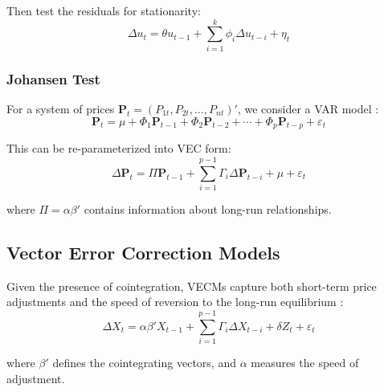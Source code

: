Then test the residuals for stationarity:
\vspace{-0.5em}
\begin{equation}
\Delta u_t = \theta u_{t-1} + \sum_{i=1}^{k} \phi_i \Delta u_{t-i} + \eta_t
\end{equation}
\vspace{-0.5em}

\subsubsection{Johansen Test}
For a system of prices $\mathbf{P}_t = (P_{1t}, P_{2t}, \ldots, P_{nt})'$, we consider a VAR model \citep{johansen1995}:
\vspace{-0.5em}
\begin{equation}
\mathbf{P}_t = \mu + \Phi_1 \mathbf{P}_{t-1} + \Phi_2 \mathbf{P}_{t-2} + \cdots + \Phi_p \mathbf{P}_{t-p} + \varepsilon_t
\end{equation}
\vspace{-0.5em}

This can be re-parameterized into VEC form:
\vspace{-0.5em}
\begin{equation}
\Delta \mathbf{P}_t = \Pi \mathbf{P}_{t-1} + \sum_{i=1}^{p-1} \Gamma_i \Delta \mathbf{P}_{t-i} + \mu + \varepsilon_t
\end{equation}
\vspace{-0.5em}

where $\Pi = \alpha \beta'$ contains information about long-run relationships.

\subsection{Vector Error Correction Models}
Given the presence of cointegration, VECMs capture both short-term price adjustments and the speed of reversion to the long-run equilibrium \citep{lutkepohl2005}:
\vspace{-0.5em}
\begin{equation}
\Delta X_t = \alpha \beta' X_{t-1} + \sum_{i=1}^{p-1} \Gamma_i \Delta X_{t-i} + \delta Z_t + \varepsilon_t
\end{equation}
\vspace{-0.5em}

where $\beta'$ defines the cointegrating vectors, and $\alpha$ measures the speed of adjustment.

